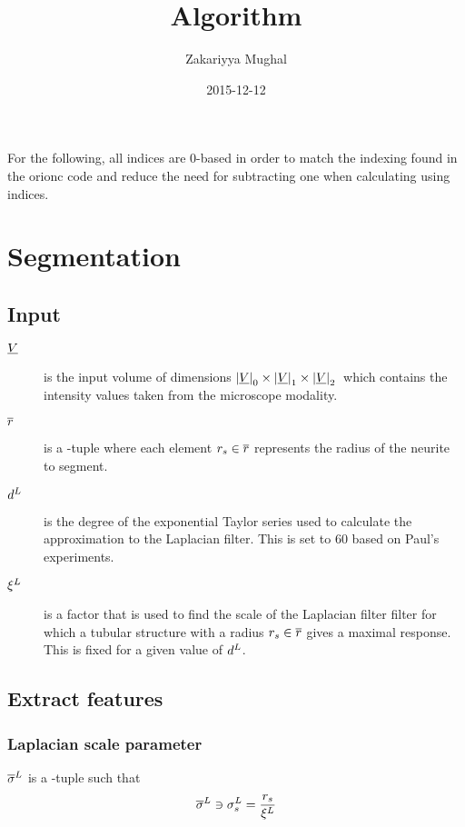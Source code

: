 \documentclass[12pt]{article}
\title{Algorithm}
\author{Zakariyya Mughal}
\date{2015-12-12}
\begin{document}
\maketitle
\tableofcontents

For the following, all indices are 0-based in order to match the
indexing found in the \gls{orionc} code and reduce the need for
subtracting one when calculating using indices.

\section{Segmentation}

\subsection{Input}

\begin{description}
	\item[\(\underline{V}{}\)] is the input volume of dimensions
		\(\left|\underline{V}\right|_0 \times \left|\underline{V}\right|_1 \times \left|\underline{V}\right|_2{}\) which contains the intensity values taken
		from the microscope modality.
	\item[\(\overline{r}{}\)] is a \Dim{\RadiiScalesName}-tuple where each element
		\(r_{s} \in \overline{r}\)
		represents the radius of the neurite to segment.
	\item[\(d^{L}{}\)] is the degree of the
		exponential Taylor series used to calculate the approximation
		to the Laplacian filter. This is set to \(\num{60}\) based on Paul's
		experiments.
	\item[\(\xi^{L}{}\)] is a factor that
		is used to find the scale of the Laplacian filter
		filter for which a tubular structure with a radius
		\(r_{s} \in \overline{r}\)
		gives a maximal response. This is fixed for a
		given value of \(d^{L}\).
\end{description}

\subsection{Extract features}

\subsubsection{Laplacian scale parameter}

\(\overline{\sigma}^{L}\) is a \Dim{\RadiiScalesName}-tuple such that
\begin{equation*}
	\overline{\sigma}^{L} \ni \sigma^{L}_{s}{} = \frac{r_{s}{}}{\xi^{L}}
\end{equation*}
\end{document}
